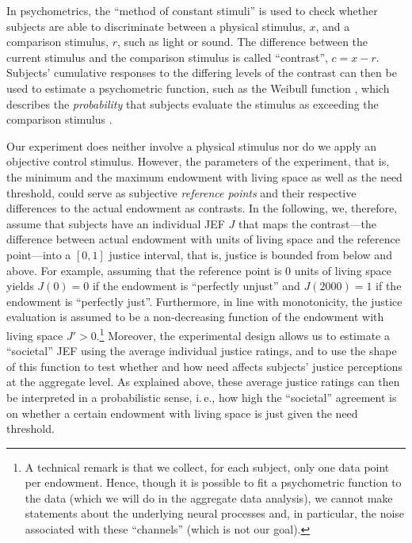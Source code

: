 \documentclass[12pt]{scrartcl}
\begin{document}
In psychometrics, the ``method of constant stimuli'' is used to check whether subjects are able to discriminate between a physical stimulus, $x$, and a comparison stimulus, $r$, such as light or sound.
The difference between the current stimulus and the comparison stimulus is called ``contrast'', $c=x-r$.
Subjects' cumulative responses to the differing levels of the contrast can then be used to estimate a psychometric function, such as the Weibull function \citep{wichmann_psychometric_2001,mortensen_additive_2002}, which describes the \textit{probability} that subjects evaluate the stimulus as exceeding the comparison stimulus \citep[p.~2503]{treutwein_adaptive_1995}.

Our experiment does neither involve a physical stimulus nor do we apply an objective control stimulus.
However, the parameters of the experiment, that is, the minimum and the maximum endowment with living space as well as the need threshold, could serve as subjective \textit{reference points} and their respective differences to the actual endowment as contrasts. 
In the following, we, therefore, assume that subjects have an individual JEF $J$ that maps the contrast---the difference between actual endowment with units of living space and the reference point---into a $[0,1]$ justice interval, that is, justice is bounded from below and above.
For example, assuming that the reference point is $0$ units of living space yields $J(0)=0$ if the endowment is ``perfectly unjust'' and $J(2000)=1$ if the endowment is ``perfectly just''.
Furthermore, in line with monotonicity, the justice evaluation is assumed to be a non-decreasing function of the endowment with living space $J'>0$.\footnote{A technical remark is that we collect, for each subject, only one data point per endowment. Hence, though it is possible to fit a psychometric function to the data (which we will do in the aggregate data analysis), we cannot make statements about the underlying neural processes and, in particular, the noise associated with these ``channels'' (which is not our goal).}
Moreover, the experimental design allows us to estimate a ``societal'' JEF using the average individual justice ratings, and to use the shape of this function to test whether and how need affects subjects' justice perceptions at the aggregate level. As explained above, these average justice ratings can then be interpreted in a probabilistic sense, i.\,e., how high the ``societal'' agreement is on whether a certain endowment with living space is just given the need threshold.
\end{document}
